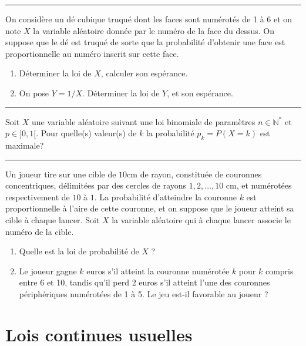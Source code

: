 \documentclass[../PolyS4.tex]{subfiles}
\begin{document}
\hfill\break
\hrule
\hfill\break




On considère un dé cubique truqué dont les faces sont numérotés de 1 à 6 et on note $X$ la variable aléatoire donnée par le numéro de la face du dessus. On suppose que le dé est truqué de sorte que la probabilité d'obtenir une face est proportionnelle au numéro inscrit sur cette face. 
\begin{enumerate}
\item Déterminer la loi de $X$, calculer son espérance.
\item On pose $Y=1/X$. Déterminer la loi de $Y$, et son espérance.\\
\end{enumerate}

\hfill\break
\hrule
\hfill\break





Soit $X$ une variable aléatoire suivant une loi binomiale de paramètres $n\in\mathbb N^*$ et $p\in ]0,1[$. Pour quelle(s) valeur(s) de $k$ la probabilité $p_k=P(X=k)$ est maximale?\\

\hfill\break
\hrule
\hfill\break



Un joueur tire sur une cible de $10$cm de rayon, constituée de couronnes concentriques,
délimitées par des cercles de rayons $1,2, \dots, 10$ cm, et numérotées respectivement de $10$ à $1$. La probabilité d'atteindre la couronne $k$ est proportionnelle à l'aire de cette couronne, et on suppose que le joueur atteint sa cible à chaque lancer. Soit $X$ la variable aléatoire qui à chaque lancer associe le numéro de la cible.
\begin{enumerate}
\item Quelle est la loi de probabilité de $X$ ?
\item Le joueur gagne $k$ euros s'il atteint la couronne numérotée $k$ pour $k$ compris entre 6 et 10, tandis qu'il perd 2 euros s'il atteint l'une des couronnes périphériques numérotées de 1 à 5. Le jeu est-il
favorable au joueur ?\\
\end{enumerate}


\section{Lois continues usuelles}
\end{document}
